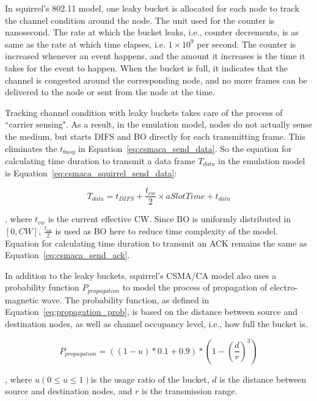 \documentclass[12pt]{report}
\begin{document}
In squirrel's 802.11 model, one leaky bucket is allocated for each node to track the channel condition around the node. The unit used for the counter is nanosecond. The rate at which the bucket leaks, i.e., counter decrements, is as same as the rate at which time elapses, i.e. $1\times 10^9$ per second. The counter is increased whenever an event happens, and the amount it increases is the time it takes for the event to happen. When the bucket is full, it indicates that the channel is congested around the corresponding node, and no more frames can be delivered to the node or sent from the node at the time.

Tracking channel condition with leaky buckets takes care of the process of ``carrier sensing". As a result, in the emulation model, nodes do not actually sense the medium, but starts DIFS and BO directly for each transmitting frame. This eliminates the $t_{busy}$ in Equation~\ref{eq:csmaca_send_data}. So the equation for calculating time duration to transmit a data frame $T_{data}$ in the emulation model is Equation~\ref{eq:csmaca_squirrel_send_data}:

\begin{equation}
  T_{data}=t_{DIFS}+\frac{t_{cw}}{2}\times aSlotTime+t_{data}
  \label{eq:csmaca_squirrel_send_data}
\end{equation}

, where $t_{cw}$ is the current effective CW. Since BO is uniformly distributed in $[0,CW]$, $\frac{t_{cw}}{2}$ is used as BO here to reduce time complexity of the model. Equation for calculating time duration to transmit an ACK remains the same as Equation~\ref{eq:csmaca_send_ack}.

In addition to the leaky buckets, squirrel's CSMA/CA model also uses a probability function $P_{propagation}$ to model the process of propagation of electro-magnetic wave. The probability function, as defined in Equation~\ref{eq:propagation_prob}, is based on the distance between source and destination nodes, as well as channel occupancy level, i.e., how full the bucket is.

\begin{equation}
  P_{propagation}=((1-u) * 0.1 + 0.9) * (1-(\frac{d}{r})^3)
  \label{eq:propagation_prob}
\end{equation}

, where $u(0\le u\le 1)$is the usage ratio of the bucket, $d$ is the distance between source and destination nodes, and $r$ is the transmission range.
\end{document}
